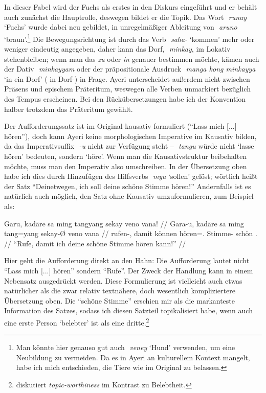 \documentclass[12pt,paper=a4]{scrartcl}
\newcommand{\fw}[1]{\textit{#1}} %
\newcommand{\zwsp}{\mbox{​}} %
\newcommand{\rayr}[2]{\zwsp\smash{{\Tagati #1}} \emph{#2}} %
\newcommand{\xayr}[3]{\zwsp\smash{\Tagati #1} \emph{#2} `#3'} %
\begin{document}
\xe

In dieser Fabel wird der Fuchs als erstes in den Diskurs eingeführt und er behält auch zunächst die Hauptrolle, deswegen bildet er die Topik. Das Wort \xayr{runj}{runay}{Fuchs} wurde dabei neu gebildet, in unregelmäßiger Ableitung von \xayr{Aruno}{aruno}{braun}.\footnote{Man könnte hier genauso gut auch \xayr{venej}{veney}{Hund} verwenden, um eine Neubildung zu vermeiden. Da es in Ayeri an kulturellem Kontext mangelt, habe ich mich entschieden, die Tiere wie im Original zu belassen.} Die Bewegungsrichtung ist durch das Verb \xayr{sh/}{saha-}{kommen} mehr oder weniger eindeutig angegeben, daher kann das Dorf, \rayr{miMkj}{minkay}, im Lokativ stehenbleiben; wenn man das \fw{zu} oder \fw{in} genauer bestimmen möchte, kämen auch der Dativ \rayr{miMkjymF}{minkayyam} oder der präpositionale Ausdruck \xayr{mN koNF miMkjy}{manga kong minkayya}{in ein Dorf} (\Dyn{} in Dorf-\Loc{}) in Frage. Ayeri unterscheidet außerdem nicht zwischen Präsens und epischem Präteritum, weswegen alle Verben unmarkiert bezüglich des Tempus erscheinen. Bei den Rückübersetzungen habe ich der Konvention halber trotzdem das Präteritum gewählt.

Der Aufforderungssatz ist im Original kausativ formuliert (\enquote{Lass mich [...] hören}), doch kann Ayeri keine morphologischen Imperative im Kausativ bilden, da das Imperativsuffix \rayr{/U}{-u} nicht zur Verfügung steht -- \rayr{tNu}{tangu} würde nicht `lasse hören' bedeuten, sondern `höre'. Wenn man die Kausativstruktur beibehalten möchte, muss man den Imperativ also umschreiben. In der Übersetzung oben habe ich dies durch Hinzufügen des Hilfsverbs \xayr{mY}{mya}{sollen} gelöst; wörtlich heißt der Satz \enquote{Deinetwegen, ich soll deine schöne Stimme hören!} Andernfalls ist es natürlich auch möglich, den Satz ohne Kausativ umzuformulieren, zum Beispiel als:

\exdisplay[everygl=\hspace*{1em}]\noexno
\begingl
	\gla Garu, kadāre sa ming tangyang sekay veno vana! //
	\glb Gara-u, kadāre sa ming tang=yang sekay-Ø veno vana //
	\glc rufen-\Imp{}, damit \PatT{} können hören=\Fsg{}.\Aarg{} Stimme-\Top{} schön \Ssg{}.\Gen{} //
	\glft \enquote{Rufe, damit ich deine schöne Stimme hören kann!} //
\endgl
\xe

Hier geht die Aufforderung direkt an den Hahn: Die Aufforderung lautet nicht \enquote{Lass mich [...] hören} sondern \enquote{Rufe}. Der Zweck der Handlung kann in einem Nebensatz ausgedrückt werden. Diese Formulierung ist vielleicht auch etwas natürlicher als die zwar relativ textnähere, doch wesentlich kompliziertere Übersetzung oben. Die \enquote{schöne Stimme} erschien mir als die markanteste Information des Satzes, sodass ich diesen Satzteil topikalisiert habe, wenn auch eine erste Person \enquote*{belebter} ist als eine dritte.\footnote{\textcite[197--199]{comrie1989} diskutiert \fw{topic-worthiness} im Kontrast zu Belebtheit.}
\end{document}
